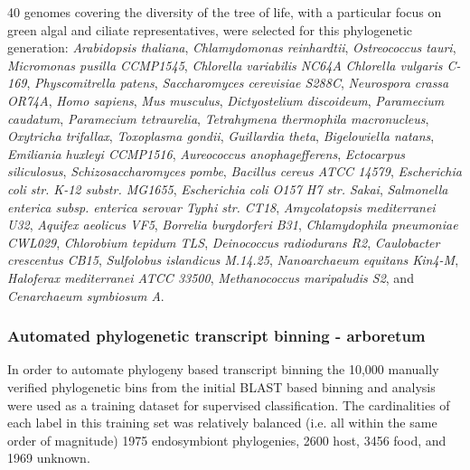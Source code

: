 40 genomes covering the diversity of the tree of life, with a particular focus on green algal and ciliate representatives,
were selected for this phylogenetic generation: 
\textit{Arabidopsis thaliana}, \textit{Chlamydomonas reinhardtii},
\textit{Ostreococcus tauri}, \textit{Micromonas pusilla CCMP1545},  \textit{Chlorella variabilis NC64A}
\textit{Chlorella vulgaris C-169}, \textit{Physcomitrella patens}, \textit{Saccharomyces cerevisiae S288C}, 
\textit{Neurospora crassa OR74A},
\textit{Homo sapiens},
\textit{Mus musculus},
\textit{Dictyostelium discoideum},
\textit{Paramecium caudatum},
\textit{Paramecium tetraurelia},
\textit{Tetrahymena thermophila macronucleus},
\textit{Oxytricha trifallax},
\textit{Toxoplasma gondii},
\textit{Guillardia theta},
\textit{Bigelowiella natans},
\textit{Emiliania huxleyi CCMP1516},
\textit{Aureococcus anophagefferens},
\textit{Ectocarpus siliculosus},
\textit{Schizosaccharomyces pombe},
\textit{Bacillus cereus ATCC 14579},
\textit{Escherichia coli str. K-12 substr. MG1655},
\textit{Escherichia coli O157 H7 str. Sakai},
\textit{Salmonella enterica subsp. enterica serovar Typhi str. CT18},
\textit{Amycolatopsis mediterranei U32},
\textit{Aquifex aeolicus VF5},
\textit{Borrelia burgdorferi B31},
\textit{Chlamydophila pneumoniae CWL029},
\textit{Chlorobium tepidum TLS},
\textit{Deinococcus radiodurans R2},
\textit{Caulobacter crescentus CB15},
\textit{Sulfolobus islandicus M.14.25},
\textit{Nanoarchaeum equitans Kin4-M},
\textit{Haloferax mediterranei ATCC 33500},
\textit{Methanococcus maripaludis S2}, and
\textit{Cenarchaeum symbiosum A}.

\subsubsection{Automated phylogenetic transcript binning - arboretum}
In order to automate phylogeny based transcript binning the 10,000
manually verified phylogenetic bins from the initial BLAST based binning
and analysis were used as a training dataset for supervised classification.
The cardinalities of each label in this training set was relatively balanced (i.e. all within
the same order of magnitude) 1975 endosymbiont phylogenies, 2600 host, 3456 food, and 1969
unknown. 

